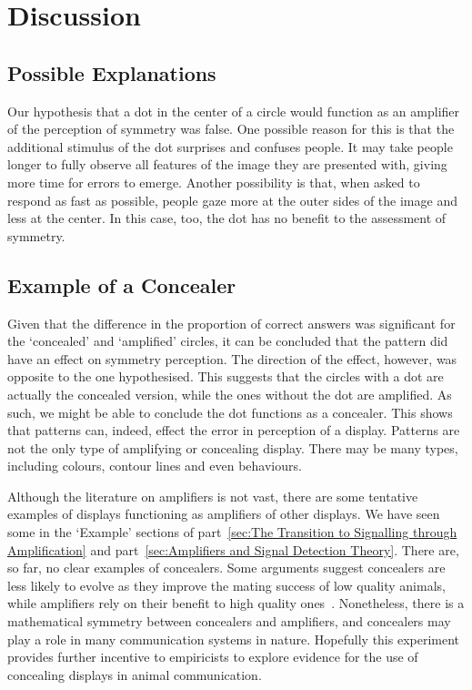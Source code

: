 \documentclass[a4paper,12pt]{article}
\numberwithin{equation}{section}
\begin{document}
\newpage\clearpage


\section{Discussion}
\label{sec:Part1/Conclusion}
\subsection{Possible Explanations}
\label{sec:Possible Explanations}

Our hypothesis that a dot in the center of a circle would function as an amplifier of the perception of symmetry was false. One possible reason for this is that the additional stimulus of the dot surprises and confuses people. It may take people longer to fully observe all features of the image they are presented with, giving more time for errors to emerge. Another possibility is that, when asked to respond as fast as possible, people gaze more at the outer sides of the image and less at the center. In this case, too, the dot has no benefit to the assessment of symmetry.

\subsection{Example of a Concealer}
\label{sec:Example of a Concealer}

Given that the difference in the proportion of correct answers was significant for the `concealed' and `amplified' circles, it can be concluded that the pattern did have an effect on symmetry perception. The direction of the effect, however, was opposite to the one hypothesised. This suggests that the circles with a dot are actually the concealed version, while the ones without the dot are amplified. As such, we might be able to conclude the dot functions as a concealer. This shows that patterns can, indeed, effect the error in perception of a display. Patterns are not the only type of amplifying or concealing display. There may be many types, including colours, contour lines and even behaviours.

Although the literature on amplifiers is not vast, there are some tentative examples of displays functioning as amplifiers of other displays. We have seen some in the `Example' sections of part~\ref{sec:The Transition to Signalling through Amplification} and part~\ref{sec:Amplifiers and Signal Detection Theory}. There are, so far, no clear examples of concealers. Some arguments suggest concealers are less likely to evolve as they improve the mating success of low quality animals, while amplifiers rely on their benefit to high quality ones~\cite{Hasson1992}. Nonetheless, there is a mathematical symmetry between concealers and amplifiers, and concealers may play a role in many communication systems in nature. Hopefully this experiment provides further incentive to empiricists to explore evidence for the use of concealing displays in animal communication.
\end{document}

